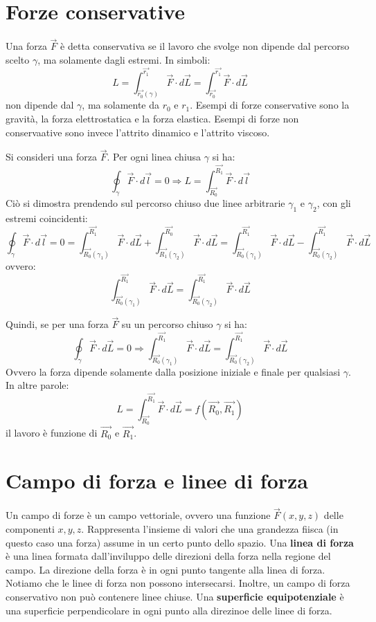 \documentclass[a4paper,12pt]{article}
\begin{document}
\section{Forze conservative}
Una forza $\vec{F}$ è detta conservativa se il lavoro che svolge non dipende dal percorso scelto $\gamma$, ma solamente dagli estremi.
In simboli:
$$ L = \int_{\vec{r_0} (\gamma)}^{\vec{r_1}} \vec{F} \cdot d\vec{L} = \int_{\vec{r_0}}^{\vec{r_1}} \vec{F} \cdot d\vec{L}$$
non dipende dal $\gamma$, ma solamente da $r_0$ e $r_1$.
Esempi di forze conservative sono la gravità, la forza elettrostatica e la forza elastica. Esempi di forze non conservaative sono
invece l'attrito dinamico e l'attrito viscoso.
\par\smallskip
Si consideri una forza $\vec{F}$. Per ogni linea chiusa $\gamma$ si ha:
$$ \oint_\gamma \vec{F} \cdot d\vec{l} = 0 \Rightarrow L = \int_{\vec{R_0}}^{\vec{R_1}}\vec{F} \cdot d\vec{l}$$
Ciò si dimostra prendendo sul percorso chiuso due linee arbitrarie $\gamma_1$ e $\gamma_2$, con gli estremi coincidenti:
$$ \oint_\gamma \vec{F}\cdot d\vec{l} = 0 = \int_{\vec{R_0} (\gamma_1)}^{\vec{R_1}} \vec{F}\cdot d\vec{L} + \int_{\vec{R_1} (\gamma_2)}^{\vec{R_0}} \vec{F}\cdot d\vec{L} = \int_{\vec{R_0} (\gamma_1)}^{\vec{R_1}} \vec{F}\cdot d\vec{L} - \int_{\vec{R_0} (\gamma_2)}^{\vec{R_1}} \vec{F}\cdot d\vec{L} $$
ovvero:
$$ \int_{\vec{R_0} (\gamma_1)}^{\vec{R_1}} \vec{F}\cdot d\vec{L} = \int_{\vec{R_0} (\gamma_2)}^{\vec{R_1}} \vec{F}\cdot d\vec{L} $$

Quindi, se per una forza $\vec{F}$ su un percorso chiuso $\gamma$ si ha:
$$ \oint_\gamma \vec{F} \cdot d\vec{L} = 0 \Rightarrow \int_{\vec{R_0} (\gamma_1)}^{\vec{R_1}} \vec{F}\cdot d\vec{L} = \int_{\vec{R_0} (\gamma_2)}^{\vec{R_1}} \vec{F}\cdot d\vec{L} $$
Ovvero la forza dipende solamente dalla posizione iniziale e finale per qualsiasi $\gamma$.
In altre parole:
$$ L = \int_{\vec{R_0}}^{\vec{R_1}} \vec{F}\cdot d\vec{L} = f(\vec{R_0}, \vec{R_1}) $$
il lavoro è funzione di $\vec{R_0}$ e $\vec{R_1}$.

\section{Campo di forza e linee di forza}
Un campo di forze è un campo vettoriale, ovvero una funzione $\vec{F}(x,y,z)$ delle componenti $x, y, z$. Rappresenta
l'insieme di valori che una grandezza fiisca (in questo caso una forza) assume in un certo punto dello spazio.
Una \textbf{linea di forza} è una linea formata dall'inviluppo delle direzioni della forza nella regione del campo. La direzione
della forza è in ogni punto tangente alla linea di forza. Notiamo che le linee di forza non possono intersecarsi. Inoltre,
un campo di forza conservativo non può contenere linee chiuse. Una \textbf{superficie equipotenziale} è una superficie perpendicolare
in ogni punto alla direzinoe delle linee di forza.
\end{document}
